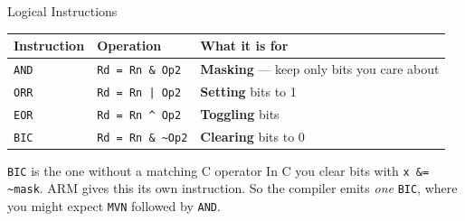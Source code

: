 \documentclass[9pt,aspectratio=169,xcolor=table]{beamer}
\begin{document}
\begin{frame}{Logical Instructions}
    \begin{center}
    {\small
    \striped
    \begin{tabular}{@{}l l l@{}}
        \toprule
        \textbf{Instruction} & \textbf{Operation} & \textbf{What it is for} \\
        \midrule
        \texttt{AND} & \texttt{Rd = Rn \& Op2}                & \textbf{Masking} --- keep only bits you care about \\
        \texttt{ORR} & \texttt{Rd = Rn | Op2}                 & \textbf{Setting} bits to 1 \\
        \texttt{EOR} & \texttt{Rd = Rn \^{} Op2}              & \textbf{Toggling} bits \\
        \texttt{BIC} & \texttt{Rd = Rn \& \textasciitilde Op2}& \textbf{Clearing} bits to 0 \\
        \bottomrule
    \end{tabular}}
    \end{center}

    \vspace{3mm}
    \begin{block}{\texttt{BIC} is the one without a matching C operator}
        In C you clear bits with \texttt{x \&= \textasciitilde mask}.
        ARM gives this its own instruction. So the compiler emits
        \emph{one} \texttt{BIC}, where you might expect \texttt{MVN}
        followed by \texttt{AND}.
    \end{block}
\end{frame}
\end{document}
